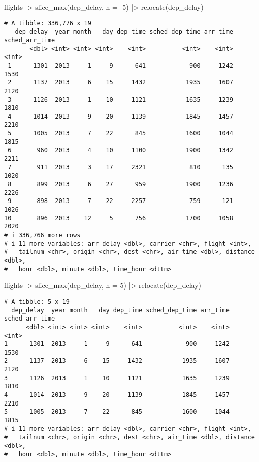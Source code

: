 \documentclass[
  letterpaper,
  DIV=11,
  numbers=noendperiod]{scrreprt}
\newenvironment{Shaded}{\begin{snugshade}}{\end{snugshade}}
\newcommand{\AttributeTok}[1]{\textcolor[rgb]{0.40,0.45,0.13}{#1}}
\newcommand{\DecValTok}[1]{\textcolor[rgb]{0.68,0.00,0.00}{#1}}
\newcommand{\FunctionTok}[1]{\textcolor[rgb]{0.28,0.35,0.67}{#1}}
\newcommand{\NormalTok}[1]{\textcolor[rgb]{0.00,0.23,0.31}{#1}}
\newcommand{\SpecialCharTok}[1]{\textcolor[rgb]{0.37,0.37,0.37}{#1}}
\begin{document}
\begin{enumerate}
\begin{tcolorbox}
\begin{Shaded}
\begin{Highlighting}[]
\NormalTok{flights }\SpecialCharTok{|\textgreater{}} 
  \FunctionTok{slice\_max}\NormalTok{(dep\_delay, }\AttributeTok{n =} \SpecialCharTok{{-}}\DecValTok{5}\NormalTok{) }\SpecialCharTok{|\textgreater{}}
  \FunctionTok{relocate}\NormalTok{(dep\_delay)}
\end{Highlighting}
\end{Shaded}

\begin{verbatim}
# A tibble: 336,776 x 19
   dep_delay  year month   day dep_time sched_dep_time arr_time sched_arr_time
       <dbl> <int> <int> <int>    <int>          <int>    <int>          <int>
 1      1301  2013     1     9      641            900     1242           1530
 2      1137  2013     6    15     1432           1935     1607           2120
 3      1126  2013     1    10     1121           1635     1239           1810
 4      1014  2013     9    20     1139           1845     1457           2210
 5      1005  2013     7    22      845           1600     1044           1815
 6       960  2013     4    10     1100           1900     1342           2211
 7       911  2013     3    17     2321            810      135           1020
 8       899  2013     6    27      959           1900     1236           2226
 9       898  2013     7    22     2257            759      121           1026
10       896  2013    12     5      756           1700     1058           2020
# i 336,766 more rows
# i 11 more variables: arr_delay <dbl>, carrier <chr>, flight <int>,
#   tailnum <chr>, origin <chr>, dest <chr>, air_time <dbl>, distance <dbl>,
#   hour <dbl>, minute <dbl>, time_hour <dttm>
\end{verbatim}

\begin{Shaded}
\begin{Highlighting}[]
\NormalTok{flights }\SpecialCharTok{|\textgreater{}} 
  \FunctionTok{slice\_max}\NormalTok{(dep\_delay, }\AttributeTok{n =} \DecValTok{5}\NormalTok{) }\SpecialCharTok{|\textgreater{}}
  \FunctionTok{relocate}\NormalTok{(dep\_delay)}
\end{Highlighting}
\end{Shaded}

\begin{verbatim}
# A tibble: 5 x 19
  dep_delay  year month   day dep_time sched_dep_time arr_time sched_arr_time
      <dbl> <int> <int> <int>    <int>          <int>    <int>          <int>
1      1301  2013     1     9      641            900     1242           1530
2      1137  2013     6    15     1432           1935     1607           2120
3      1126  2013     1    10     1121           1635     1239           1810
4      1014  2013     9    20     1139           1845     1457           2210
5      1005  2013     7    22      845           1600     1044           1815
# i 11 more variables: arr_delay <dbl>, carrier <chr>, flight <int>,
#   tailnum <chr>, origin <chr>, dest <chr>, air_time <dbl>, distance <dbl>,
#   hour <dbl>, minute <dbl>, time_hour <dttm>
\end{verbatim}


\end{tcolorbox}
\end{enumerate}
\end{document}
